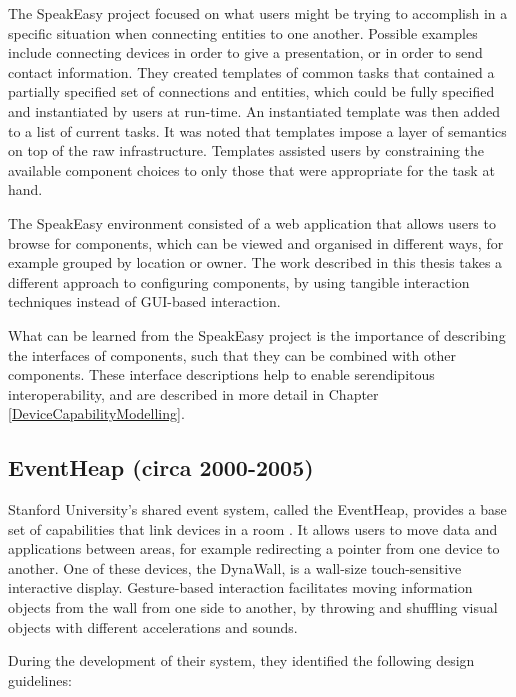 \label{InformationFiltering} %
The SpeakEasy project focused on what users might be trying to accomplish in a specific situation when connecting entities to one another. Possible examples include connecting devices in order to give a presentation, or in order to send contact information. They created templates of common tasks that contained a partially specified set of connections and entities, which could be fully specified and instantiated by users at run-time. An instantiated template was then added to a list of current tasks. It was noted that templates impose a layer of semantics on top of the raw infrastructure. Templates assisted users by constraining the available component choices to only those that were appropriate for the task at hand.

The SpeakEasy environment consisted of a web application that allows users to browse for components, which can be viewed and organised in different ways, for example grouped by location or owner. The work described in this thesis takes a different approach to configuring components, by using tangible interaction techniques instead of \ac{GUI}-based interaction.

What can be learned from the SpeakEasy project is the importance of describing the interfaces of components, such that they can be combined with other components. These interface descriptions help to enable serendipitous interoperability, and are described in more detail in Chapter \ref{DeviceCapabilityModelling}. 


\subsection{EventHeap (circa 2000-2005)}

Stanford University's shared event system, called the EventHeap, provides a base set of capabilities that link devices in a room \cite{Winograd2005}. It allows users to move data and applications between areas, for example redirecting a pointer from one device to another. One of these devices, the DynaWall, is a wall-size touch-sensitive interactive display. Gesture-based interaction facilitates moving information objects from the wall from one side to another, by throwing and shuffling visual objects with different accelerations and sounds.

During the development of their system, they identified the following design guidelines:

